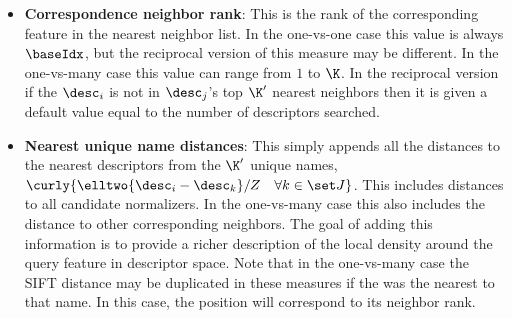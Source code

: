 \begin{itemize}
                \item \textbf{Correspondence neighbor rank}:
                    This is the rank of the corresponding feature in the
                      nearest neighbor list.
                    In the one-vs-one case this value is always $\baseIdx$,
                      but the reciprocal version of this measure may be
                      different.
                    In the one-vs-many case this value can range from $1$ to
                      $\K$.
                    In the reciprocal version if the $\desc_i$ is not in
                      $\desc_j$'s top $\K'$ nearest neighbors then it is given a
                      default value equal to the number of descriptors searched.

                \item \textbf{Nearest unique name distances}:
                    This simply appends all the distances to the nearest
                      descriptors from the $\K'$ unique names,
                      $\curly{\elltwo{\desc_i - \desc_{k}} / Z \quad \forall k
                      \in \Jname}$.
                    This includes distances to all candidate normalizers.
                    In the one-vs-many case this also includes the distance to
                      other corresponding neighbors.
                    The goal of adding this information is to provide a richer
                      description of the local density around the query feature
                      in descriptor space.
                    Note that in the one-vs-many case the SIFT
                      \correspondence{} distance may be duplicated in these
                      measures if the \correspondence{} was the nearest
                      \correspondence{} to that name.
                    In this case, the position will correspond to its
                      \correspondence{} neighbor rank.


\end{itemize}
